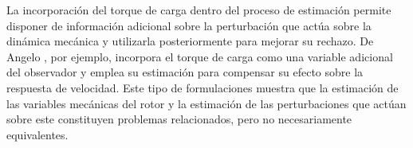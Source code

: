 La incorporación del torque de carga dentro del proceso de estimación permite
disponer de información adicional sobre la perturbación que actúa sobre la
dinámica mecánica y utilizarla posteriormente para mejorar su rechazo. De
Angelo \cite{deangeloControlParaMaquinas2004}, por ejemplo, incorpora el
torque de carga como una variable adicional del observador y emplea su
estimación para compensar su efecto sobre la respuesta de velocidad. Este
tipo de formulaciones muestra que la estimación de las variables mecánicas
del rotor y la estimación de las perturbaciones que actúan sobre este
constituyen problemas relacionados, pero no necesariamente equivalentes.
%
%
%
%
%
%
%
%
%
%
%
%
%

